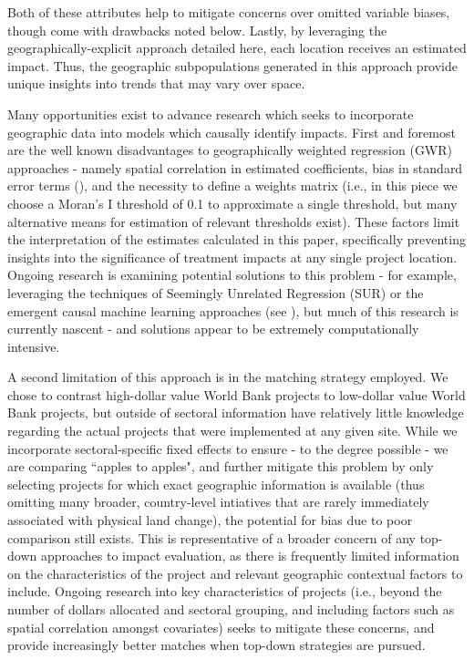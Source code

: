 \documentclass{article}\usepackage[]{graphicx}\usepackage[]{color}
\newenvironment{knitrout}{}{}  %
\begin{document}
\begin{knitrout}
Both of these attributes help to mitigate concerns over omitted variable biases, though come with drawbacks noted below.
Lastly, by leveraging the geographically-explicit approach detailed here, each location receives an estimated impact.
Thus, the geographic subpopulations generated in this approach provide unique insights into trends that may vary over space.
\par
Many opportunities exist to advance research which seeks to incorporate geographic data into models which causally identify impacts.
First and foremost are the well known disadvantages to geographically weighted regression (GWR) approaches - namely spatial correlation in estimated coefficients, bias in standard error terms (\cite{wheeler_multicollinearity_2005}), and the necessity to define a weights matrix (i.e., in this piece we choose a Moran's I threshold of 0.1 to approximate a single threshold, but many alternative means for estimation of relevant thresholds exist).  
These factors limit the interpretation of the estimates calculated in this paper, specifically preventing insights into the significance of treatment impacts at any single project location.
Ongoing research is examining potential solutions to this problem - for example, leveraging the techniques of Seemingly Unrelated Regression (SUR) or the emergent causal machine learning approaches (see \cite{athey_recursive_2015}), but much of this research is currently nascent - and solutions appear to be extremely computationally intensive.
\par
A second limitation of this approach is in the matching strategy employed.
We chose to contrast high-dollar value World Bank projects to low-dollar value World Bank projects, but outside of sectoral information have relatively little knowledge regarding the actual projects that were implemented at any given site. 
While we incorporate sectoral-specific fixed effects to ensure - to the degree possible - we are comparing  ``apples to apples", and further mitigate this problem by only selecting projects for which exact geographic information is available (thus omitting many broader, country-level intiatives that are rarely immediately associated with physical land change), the potential for bias due to poor comparison still exists.
This is representative of a broader concern of any top-down approaches to impact evaluation, as there is frequently limited information on the characteristics of the project and relevant geographic contextual factors to include.
Ongoing research into key characteristics of projects (i.e., beyond the number of dollars allocated and sectoral grouping, and including factors such as spatial correlation amongst covariates) seeks to mitigate these concerns, and provide increasingly better matches when top-down strategies are pursued.

\end{knitrout}
\end{document}
